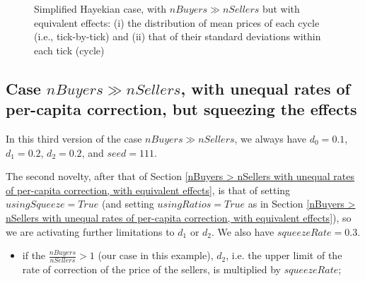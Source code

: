 \documentclass[10pt]{report}
\begin{document}
\begin{appendices}
\begin{figure}[H]
\begin{center}
\caption{Simplified Hayekian case, with $nBuyers \gg nSellers$ but with equivalent effects: (i) the distribution of mean prices of each cycle (i.e., tick-by-tick) and (ii) that of their standard deviations within each tick (cycle)}
\label{output_3_3aa.png}
\end{center}
\end{figure}

\subsection{Case $nBuyers \gg nSellers$, with unequal rates of per-capita correction, but squeezing the effects}\label{nBuyers > nSellers with unequal rates of per-capita correction, but squeezing the effects}

In this third version of the case $nBuyers \gg nSellers$, we always have $d_0=0.1$, $d_1=0.2$,  $d_2=0.2$, and $seed=111$.

The second novelty, after that of Section \ref{nBuyers > nSellers with unequal rates of per-capita correction, with equivalent effects}, is that of setting $usingSqueeze=True$ (and setting $usingRatios=True$ as in Section  \ref{nBuyers > nSellers with unequal rates of per-capita correction, with equivalent effects}), so we are activating further limitations to $d_1$ or $d_2$. We also have $squeezeRate=0.3$.

\begin{itemize}

\item if the $\frac{nBuyers}{nSellers}>1$ (our case in this example), $d_2$, i.e. the upper limit of the rate of correction of the price of the sellers, is multiplied by $squeezeRate$;


\end{itemize}
\end{appendices}
\end{document}
